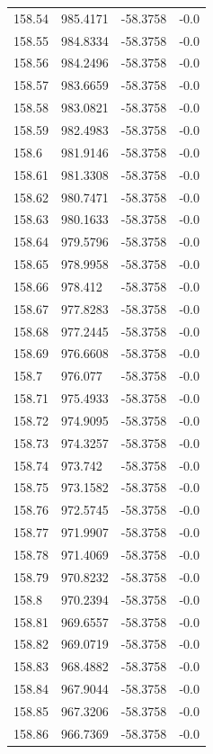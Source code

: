 \begin{table}[H]
\begin{tabular}{llll}
158.54 & 985.4171 & -58.3758 & -0.0 \\
158.55 & 984.8334 & -58.3758 & -0.0 \\
158.56 & 984.2496 & -58.3758 & -0.0 \\
158.57 & 983.6659 & -58.3758 & -0.0 \\
158.58 & 983.0821 & -58.3758 & -0.0 \\
158.59 & 982.4983 & -58.3758 & -0.0 \\
158.6 & 981.9146 & -58.3758 & -0.0 \\
158.61 & 981.3308 & -58.3758 & -0.0 \\
158.62 & 980.7471 & -58.3758 & -0.0 \\
158.63 & 980.1633 & -58.3758 & -0.0 \\
158.64 & 979.5796 & -58.3758 & -0.0 \\
158.65 & 978.9958 & -58.3758 & -0.0 \\
158.66 & 978.412 & -58.3758 & -0.0 \\
158.67 & 977.8283 & -58.3758 & -0.0 \\
158.68 & 977.2445 & -58.3758 & -0.0 \\
158.69 & 976.6608 & -58.3758 & -0.0 \\
158.7 & 976.077 & -58.3758 & -0.0 \\
158.71 & 975.4933 & -58.3758 & -0.0 \\
158.72 & 974.9095 & -58.3758 & -0.0 \\
158.73 & 974.3257 & -58.3758 & -0.0 \\
158.74 & 973.742 & -58.3758 & -0.0 \\
158.75 & 973.1582 & -58.3758 & -0.0 \\
158.76 & 972.5745 & -58.3758 & -0.0 \\
158.77 & 971.9907 & -58.3758 & -0.0 \\
158.78 & 971.4069 & -58.3758 & -0.0 \\
158.79 & 970.8232 & -58.3758 & -0.0 \\
158.8 & 970.2394 & -58.3758 & -0.0 \\
158.81 & 969.6557 & -58.3758 & -0.0 \\
158.82 & 969.0719 & -58.3758 & -0.0 \\
158.83 & 968.4882 & -58.3758 & -0.0 \\
158.84 & 967.9044 & -58.3758 & -0.0 \\
158.85 & 967.3206 & -58.3758 & -0.0 \\
158.86 & 966.7369 & -58.3758 & -0.0 \\

\end{tabular}
\end{table}
